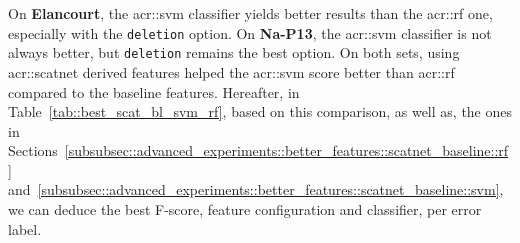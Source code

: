             On \textbf{Elancourt}, the \gls{acr::svm} classifier yields better results than the \gls{acr::rf} one, especially with the \texttt{deletion} option.
            On \textbf{Na-P13}, the \gls{acr::svm} classifier is not always better, but \texttt{deletion} remains the best option.
            On both sets, using \gls{acr::scatnet} derived features helped the \gls{acr::svm} score better than \gls{acr::rf} compared to the baseline features.
            Hereafter, in Table~\ref{tab::best_scat_bl_svm_rf}, based on this comparison, as well as, the ones in Sections~\ref{subsubsec::advanced_experiments::better_features::scatnet_baseline::rf} and~\ref{subsubsec::advanced_experiments::better_features::scatnet_baseline::svm}, we can deduce the best F-score, feature configuration and classifier, per error label.\\

